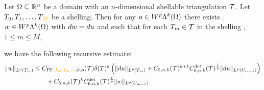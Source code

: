 \documentclass[10pt,letterpaper]{article}
\newcommand\cye[1]{%
  \protect\leavevmode
  \begingroup
    \color{red!35!yellow}%
    #1%
  \endgroup
}
\begin{document}
\begin{theorem}\label{theorem:poincarefriedrichsestimate:exterior}
    Let $\Omega \subseteq {\mathbb R}^{n}$ be a domain with \cye{an $n$-dimensional} shellable triangulation ${\mathcal T}$.
    Let $T_0, T_1, \dots, T_{\cye{M}}$ be a shelling.
    Then for any $u \in W^{p}\Lambda^{k}(\Omega)$ 
    there exists $w \in W^{p}\Lambda^{k}(\Omega)$ with $d w = d u$ 
    and such that for each $T_{m} \in {\mathcal T}$ in the shelling\cye{, $1 \leq m \leq M$,} 
    we have the following recursive estimate: 
    \begin{align*}
        \| w \|_{L^{p}(T_{m})}
        &
        \leq  
        C_{\PF,\cye{T_m, I_{m-1}},k,p}(\calT) 
        \diam(T)^{k} 
        \left( 
            \| \cartan u      \|_{L^{p}(T_{m})} 
            +
            \Cfive{n}{k}(\calT)^{k+1} 
            \Cdetsechs{n}{k}(\calT)^{\frac 1 p} 
            \| \cartan u \|_{L^{p}(U_{m-1})}
        \right)
        \\&\qquad
        + 
        \Cfive{n}{k}(\calT)^{k} 
        \Cdetsechs{n}{k}(\calT)^{\frac 1 p} 
        \| w \|_{L^{p}(U_{m-1})}
        .
    \end{align*}
\end{theorem}
\end{document}
